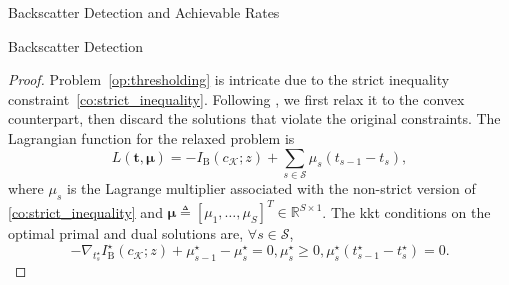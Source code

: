 \documentclass[journal]{IEEEtran}
\begin{document}
\begin{section}{Backscatter Detection and Achievable Rates}
\begin{subsection}{Backscatter Detection}
\begin{proof}
				Problem~\eqref{op:thresholding} is intricate due to the strict inequality constraint~\eqref{co:strict_inequality}. Following \cite{Nguyen2020}, we first relax it to the convex counterpart, then discard the solutions that violate the original constraints. The Lagrangian function for the relaxed problem is
				\begin{equation}
					L(\boldsymbol{t},\boldsymbol{\mu}) = - I_{\mathrm{B}}(c_{\mathcal{K}};z) + \sum_{s \in \mathcal{S}} \mu_s (t_{s-1} - t_s),
				\end{equation}
				where $\mu_s$ is the Lagrange multiplier associated with the non-strict version of \eqref{co:strict_inequality} and $\boldsymbol{\mu} \triangleq [\mu_1,\ldots,\mu_S]^T \in \mathbb{R}^{S \times 1}$. The \gls{kkt} conditions on the optimal primal and dual solutions are, $\forall s \in \mathcal{S}$,
				\begin{subequations}
					\label{eq:kkt_thresholding}
					\begin{equation}
						- \nabla_{t_s^\star} I^\star_{\mathrm{B}}(c_{\mathcal{K}};z) + \mu_{s-1}^\star - \mu_s^\star = 0,
						\label{eq:stationarity}
					\end{equation}
					\begin{equation}
						\mu_s^\star \ge 0,
						\label{eq:dual_feasibility}
					\end{equation}
					\begin{equation}
						\mu_s^\star (t_{s-1}^\star - t_s^\star) = 0.
						\label{eq:complementary_slackness}
					\end{equation}


\end{subequations}
\end{proof}
\end{subsection}
\end{section}
\end{document}
